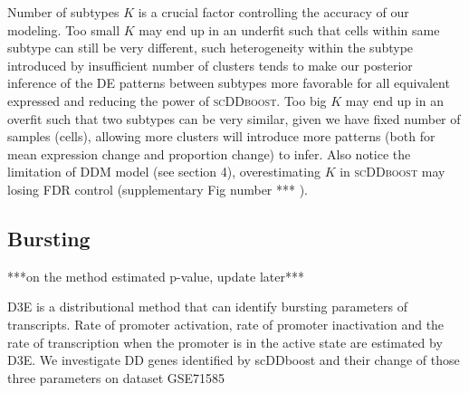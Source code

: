 \documentclass[aoas,preprint]{imsart}
\begin{document}
Number of subtypes $K$ is a crucial factor controlling the accuracy of our modeling. 
Too small $K$ may end up in an underfit such that cells within same subtype can still be very different, such heterogeneity within the subtype introduced by insufficient number of clusters 
tends to make our posterior inference of the DE patterns between subtypes more favorable for all equivalent expressed and reducing the power of \textsc{scDDboost}.
Too big $K$ may end up in an overfit such that two subtypes can be very similar, given we have fixed number of samples (cells), allowing more clusters will introduce more patterns (both for mean expression change and proportion change) to infer. 
Also notice the limitation of DDM model (see section 4), overestimating $K$ in \textsc{scDDboost} may losing FDR control (supplementary Fig number *** ). 





\subsection{Bursting}

***on the method estimated p-value, update later***

D3E\citep{ref:d3e} is a distributional method that can identify bursting parameters of transcripts. Rate of promoter activation, rate of promoter inactivation and the rate of transcription when the promoter is in the active state are estimated by D3E.  We investigate DD genes identified by scDDboost and their change of those three parameters on dataset GSE71585\\

\end{document}

